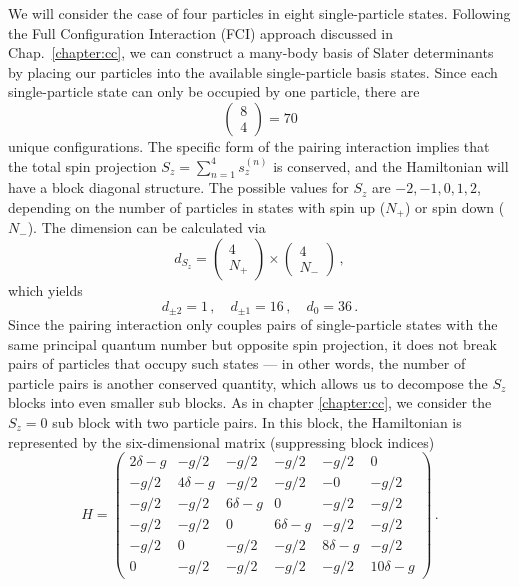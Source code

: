{We will consider the case of four particles in eight single-particle states. 
Following the Full Configuration Interaction (FCI) approach discussed in 
Chap.~\ref{chapter:cc}, we can construct a many-body basis of Slater 
determinants by placing our particles into the available single-particle 
basis states. Since each single-particle state can only be occupied by one 
particle, there are
\begin{equation}
  \begin{pmatrix} 8 \\ 4\end{pmatrix} = 70
\end{equation}
unique configurations. The specific form of the pairing interaction
implies that the total spin projection $S_z = \sum_{n=1}^4 s_z^{(n)}$ 
is conserved, and the Hamiltonian will have a block diagonal structure.
The possible values for $S_z$ are $-2,-1,0,1,2$, depending on the number
of particles in states with spin up ($N_+$) or spin down ($N_-$). The 
dimension can be calculated via
\begin{equation}
 d_{S_z} = \begin{pmatrix} 4 \\ N_{+}\end{pmatrix} \times 
           \begin{pmatrix} 4 \\ N_{-}\end{pmatrix}\,,
\end{equation}
which yields 
\begin{equation}
 d_{\pm 2} = 1\,, \quad d_{\pm 1} = 16\,, \quad d_{0} = 36\,.
\end{equation}
Since the pairing interaction only couples pairs of single-particle 
states with the same principal quantum number but opposite spin
projection, it does not break pairs of particles that occupy such 
states --- in other words, the number of particle pairs is another
conserved quantity, which allows us to decompose the $S_z$ blocks
into even smaller sub blocks. As in chapter \ref{chapter:cc}, we 
consider the $S_z=0$
sub block with two particle pairs. In this block, the Hamiltonian 
is represented by the six-dimensional matrix (suppressing block 
indices)
\begin{equation}\label{eq:def_h_matrix}
  H = \begin{pmatrix}
  2\delta -g  &      -g/2  &       -g/2 &      -g/2 &      -g/2 &        0 \\ 
         -g/2 & 4\delta -g &       -g/2 &      -g/2 &        -0 &     -g/2 \\ 
         -g/2 &       -g/2 & 6\delta -g &         0 &      -g/2 &     -g/2 \\ 
         -g/2 &       -g/2 &          0 & 6\delta-g &      -g/2 &     -g/2 \\ 
         -g/2 &          0 &       -g/2 &      -g/2 & 8\delta-g &     -g/2 \\ 
            0 &       -g/2 &       -g/2 &      -g/2 &      -g/2 & 10\delta -g
  \end{pmatrix}\,.
\end{equation}

}
